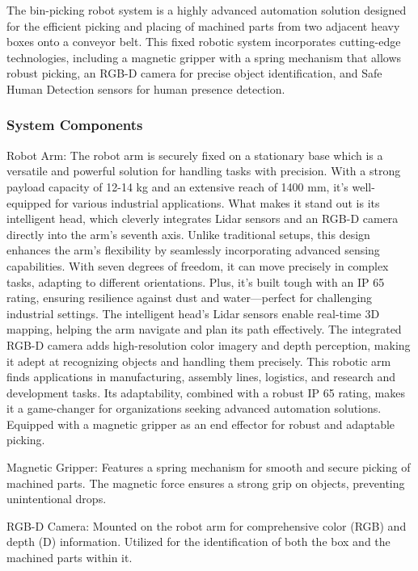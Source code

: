 {The bin-picking robot system is a highly advanced automation solution designed for the efficient picking and placing of machined parts from two adjacent heavy boxes onto a conveyor belt. This fixed robotic system incorporates cutting-edge technologies, including a magnetic gripper with a spring mechanism that allows robust picking, an RGB-D camera for precise object identification, and Safe Human Detection sensors for human presence detection.

\subsubsection{System Components}

Robot Arm: The robot arm is securely fixed on a stationary base which is a versatile and powerful solution for handling tasks with precision. With a strong payload capacity of 12-14 kg and an extensive reach of 1400 mm, it's well-equipped for various industrial applications. What makes it stand out is its intelligent head, which cleverly integrates Lidar sensors and an RGB-D camera directly into the arm's seventh axis. Unlike traditional setups, this design enhances the arm's flexibility by seamlessly incorporating advanced sensing capabilities. With seven degrees of freedom, it can move precisely in complex tasks, adapting to different orientations. Plus, it's built tough with an IP 65 rating, ensuring resilience against dust and water—perfect for challenging industrial settings. The intelligent head's Lidar sensors enable real-time 3D mapping, helping the arm navigate and plan its path effectively. The integrated RGB-D camera adds high-resolution color imagery and depth perception, making it adept at recognizing objects and handling them precisely. This robotic arm finds applications in manufacturing, assembly lines, logistics, and research and development tasks. Its adaptability, combined with a robust IP 65 rating, makes it a game-changer for organizations seeking advanced automation solutions. Equipped with a magnetic gripper as an end effector for robust and adaptable picking.

Magnetic Gripper: Features a spring mechanism for smooth and secure picking of machined parts.
The magnetic force ensures a strong grip on objects, preventing unintentional drops.

RGB-D Camera: Mounted on the robot arm for comprehensive color (RGB) and depth (D) information.
Utilized for the identification of both the box and the machined parts within it.

}
